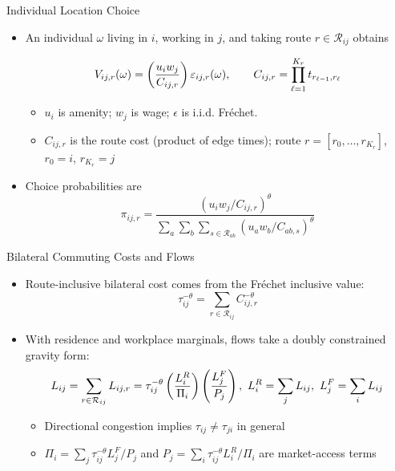 \documentclass[11pt,aspectratio=169]{beamer}
\newcommand{\R}{\mathcal{R}}
\begin{document}
\begin{frame}{Individual Location Choice}
\begin{itemize}
  \item An individual $\omega$ living in $i$, working in $j$, and taking route $r\in\R_{ij}$ obtains
  \vspace{-0.5em}\begin{footnotesize}\begin{equation}
    V_{ij,r}(\omega) = \left( \frac{u_i w_j}{C_{ij,r}} \right)\varepsilon_{ij,r}(\omega),
    \qquad
    C_{ij,r} = \prod_{\ell=1}^{K_r} t_{r_{\ell-1},r_\ell}
  \vspace{-1.25em}\end{equation}\end{footnotesize}
  \begin{itemize}
    \item $u_i$ is amenity; $w_j$ is wage; $\epsilon$ is i.i.d. Fr\'echet.
    \item $C_{ij,r}$ is the route cost (product of edge times); route $r=[r_0,\dots,r_{K_r}]$, $r_0=i$, $r_{K_r}=j$
  \end{itemize}
  \vspace{0.5em}
  \item Choice probabilities are
  \vspace{-0.5em}\begin{equation}\label{eq:pi}
    \pi_{ij,r} = \frac{\left(u_i w_j/C_{ij,r}\right)^\theta}{\sum_{a}\sum_b\sum_{s\in\R_{ab}}\left(u_a w_b/C_{ab,s}\right)^\theta}
  \end{equation}
\end{itemize}
\end{frame}

\begin{frame}[label=bilateral]{Bilateral Commuting Costs and Flows}
\begin{itemize}\small
  \item Route-inclusive bilateral cost comes from the Fr\'echet inclusive value:
  \vspace{-0.5em}\begin{equation}
    \tau_{ij}^{-\theta} = \sum_{r\in\R_{ij}} C_{ij,r}^{-\theta}
  \end{equation}
  \item With residence and workplace marginals, flows take a doubly constrained gravity form:
  \vspace{-0.25em}\begin{equation}\label{eq:gravity}
    L_{ij} = \sum_{r\in\R_{ij}}L_{ij,r} = \tau_{ij}^{-\theta} \left(\frac{L_i^R}{\Pi_i}\right) \left(\frac{L_j^F}{P_j}\right), \,\, L_i^R=\sum_jL_{ij}, \,\, L_j^F=\sum_iL_{ij}
  \vspace{-1em}\end{equation}
  \begin{itemize}
    \item Directional congestion implies $\tau_{ij}\neq\tau_{ji}$ in general
    \item $\Pi_i=\sum_j\tau_{ij}^{-\theta}L_j^F/P_j$ and $P_j=\sum_i\tau_{ij}^{-\theta}L_i^R/\Pi_i$ are market-access terms
  \end{itemize}
\end{itemize}
\end{frame}
\end{document}
